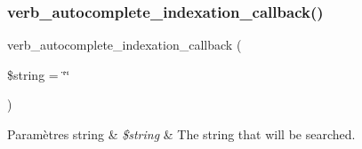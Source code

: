 \subsubsection{\texorpdfstring{verb\+\_\+autocomplete\+\_\+indexation\+\_\+callback()}{verb\_autocomplete\_indexation\_callback()}}
{\footnotesize\ttfamily verb\+\_\+autocomplete\+\_\+indexation\+\_\+callback (\begin{DoxyParamCaption}\item[{}]{\$string = {\ttfamily \char`\"{}\char`\"{}} }\end{DoxyParamCaption})}


\begin{DoxyParams}[1]{Paramètres}
string & {\em \$string} & The string that will be searched. \\
\hline
\end{DoxyParams}
